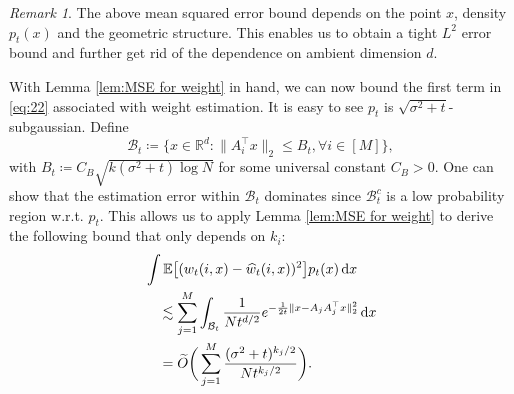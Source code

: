 \documentclass{article}
\newcommand{\defn}{\coloneqq}
\newcommand{\diff}{\,\mathrm{d}}
\newcommand{\wt}{\widetilde}
\theoremstyle{plain}
\theoremstyle{remark}
\newtheorem{remark}{Remark}
\begin{document}
\begin{remark}
    The above mean squared error bound depends on the point $x$, density $p_t(x)$ and the geometric structure. This enables us to obtain a tight $L^2$ error bound and further get rid of the dependence on ambient dimension $d$. 
\end{remark}

With Lemma \ref{lem:MSE for weight} in hand, we can now bound the first term in \eqref{eq:22} associated with weight estimation.
It is easy to see $p_t$ is $\sqrt{\sigma^2+t}$-subgaussian. Define
$$\mathcal{B}_t \defn \big\{ x \in \mathbb{R}^d: \| A_i^{\top} x\|_{2} \leq B_t, \forall i \in [M] \big\},$$
with $B_t \defn C_B \sqrt{k(\sigma^2+t)\log N}$ for some universal constant $C_B>0$. One can show that the estimation error within $\mathcal{B}_t$ dominates since $\mathcal{B}_t^c$ is a low probability region w.r.t. $p_t$.
This allows us to apply Lemma \ref{lem:MSE for weight} to
derive the following bound that only depends on $k_i$: 
\begin{align}
    & \int \mathbb{E} \big[  (w_t(i,x)-\widehat{w}_t(i,x))^2\big]p_t(x)\diff x \notag \\
    &\quad  \lesssim 
    \sum_{j=1}^M\int_{\mathcal{B}_t} \frac{1}{N t^{d/2}} e^{-\frac{1}{2t} \| x-A_jA_j^{\top}x\|_2^2}  \diff x \notag  \\
    & \quad = \wt O\bigg( 
    \sum_{j=1}^M \frac{(\sigma^2+t)^{k_j/2}}{Nt^{k_j/2}} \bigg). \label{temp1}
\end{align}
\end{document}
